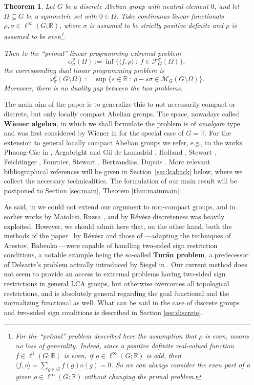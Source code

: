 \documentclass[[a4paper,english,12pt]{amsart}
\theoremstyle{plain}
\newtheorem{theorem}{Theorem}[section]
\theoremstyle{remark}
\newcommand{\FF}{\mathcal{F}}
\newcommand{\MM}{\mathcal{M}}
\newcommand{\RR}{\mathbb R}
\newcommand{\si}{\sigma}
\newcommand{\rh}{\rho}
\begin{document}
\begin{theorem}\label{thm:first}
Let $G$ be a discrete Abelian group with neutral element $0$, and let $\Omega \subseteq G$ be a symmetric set with $0\in \Omega$.  Take continuous linear functionals $\rh,\si\in \ell^\infty(G;\RR)$, where  $\si$ is assumed to be strictly positive definite
and $\rh$ is assumed to be even\footnote{For the ``primal'' problem described here the assumption that $\rh$ is even, means no loss of generality. Indeed, since a positive definite real-valued function $f\in \ell^1(G; \RR)$  is even, if  $o\in \ell^\infty(G;\RR)$ is odd, then $\langle f,o\rangle =\sum_{g\in G}f(g)o(g)=0$. So we can always consider the even part of a given $\rh\in \ell^\infty(G;\RR)$ without changing the primal problem.}.

Then to the ``primal'' linear programming extremal problem
\[
\alpha_\si^\rh (\Omega):= \inf \{\langle f,\rh\rangle~:~f \in \FF_G^\si(\Omega)\},
\]
the corresponding dual linear programming problem is
\[
\omega_\si^\rh(G\setminus\Omega):= \sup \{ s \in \RR ~:~\rh- s \si  \in \MM_G(G\setminus\Omega) \}.
\]
Moreover, there is no duality gap between the two problems.
\end{theorem}

The main aim of the paper is to generalize this to not necessarily compact or discrete, but only locally compact Abelian groups. The space, nowadays called \textbf{Wiener algebra}, in which we shall formulate the problem is of \emph{amalgam} type and was first considered by Wiener in \cite{Wiener2} for the special case of $G=\mathbb{R}$. For the extension to general locally compact Abelian groups we refer, e.g., to the works Phuong-C\'ac in \cite{Cac}, Argabright and Gil de Lamadrid \cite{AG-apm}, Holland \cite{Holland1975, Holland75b}, Stewart \cite{Stewart1979}, Feichtinger \cite{Feichtinger1977, Feichtinger1983}, Fournier, Stewart \cite{FournierStewart1985},  Bertrandias, Dupuis \cite{BD}.
More relevant bibliographical references will be given
in Section~\ref{sec:lcaback} below, where we collect the necessary technicalities. The formulation of our main result will be postponed to Section \ref{sec:main}, Theorem \ref{thm:mainmain}.

As said, in \cite{UFO} we could not extend our argument to non-compact groups, and in earlier works by Matolcsi, Ruzsa \cite{MatolcsiRuzsa}, and by R\'ev\'esz \cite{R-Austral} discreteness was heavily exploited. However, we should admit here that, on the other hand, both the methods of the paper~\cite{R-Austral} by R\'ev\'esz and those of \cite{UFO}---adapting the techniques of Arestov, Babenko \cite{AB}---were capable of handling two-sided sign restriction conditions, a notable example being the so-called \textbf{Turán problem}, a predecessor of Delsarte's problem actually introduced by Siegel in \cite{Siegel}. Our current method does not seem to provide an access to extremal problems having two-sided sign restrictions in general LCA groups, but otherwise overcomes all topological restrictions, and is absolutely general regarding the goal functional and the normalizing functional as well. What can be said in the case of discrete groups and two-sided sign conditions is described in Section \ref{sec:discrete}.
\end{document}
